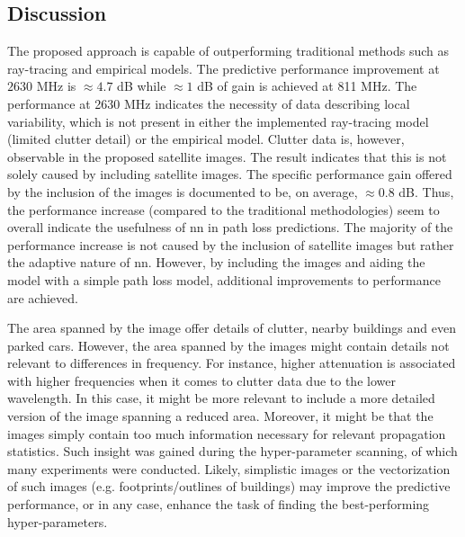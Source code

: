 \subsection{Discussion}
The proposed approach is capable of outperforming traditional methods such as ray-tracing and empirical models. The predictive performance improvement at $2630$ MHz is $\approx 4.7$ dB while $\approx 1$ dB of gain is achieved at 811 MHz. The performance at 2630 MHz indicates the necessity of data describing local variability, which is not present in either the implemented ray-tracing model (limited clutter detail) or the empirical model. Clutter data is, however, observable in the proposed satellite images. The result indicates that this is not solely caused by including satellite images. The specific performance gain offered by the inclusion of the images is documented to be, on average, $\approx 0.8$ dB. Thus, the performance increase (compared to the traditional methodologies) seem to overall indicate the usefulness of \gls{nn} in path loss predictions. The majority of the performance increase is not caused by the inclusion of satellite images but rather the adaptive nature of \gls{nn}. However, by including the images and aiding the model with a simple path loss model, additional improvements to performance are achieved. 

The area spanned by the image offer details of clutter, nearby buildings and even parked cars. However, the area spanned by the images might contain details not relevant to differences in frequency. For instance, higher attenuation is associated with higher frequencies when it comes to clutter data due to the lower wavelength. In this case, it might be more relevant to include a more detailed version of the image spanning a reduced area. Moreover, it might be that the images simply contain too much information necessary for relevant propagation statistics. Such insight was gained during the hyper-parameter scanning, of which many experiments were conducted. Likely, simplistic images or the vectorization of such images (e.g. footprints/outlines of buildings) may improve the predictive performance, or in any case, enhance the task of finding the best-performing hyper-parameters.

